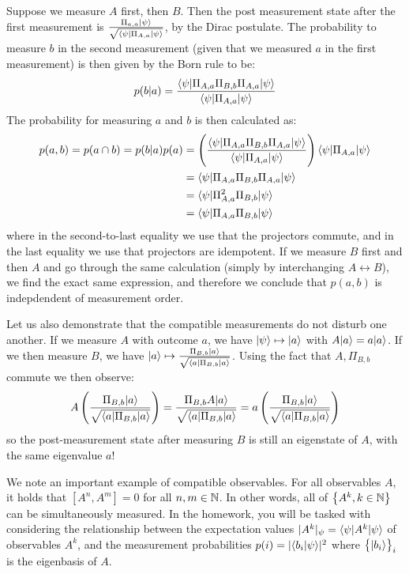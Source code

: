 Suppose we measure $A$ first, then $B$. Then the post measurement state after the first measurement is $\frac{\Pi_{a, a}\lvert \psi \rangle}{\sqrt{\langle \psi \rvert\Pi_{A, a}\lvert \psi \rangle}}$, by the Dirac postulate. The probability to measure $b$ in the second measurement (given that we measured $a$ in the first measurement) is then given by the Born rule to be:
\begin{equation}
    p(b\vert a) = \frac{\langle \psi \rvert\Pi_{A, a}\Pi_{B, b}\Pi_{A, a}\lvert \psi \rangle}{\langle \psi \rvert\Pi_{A, a}\lvert \psi \rangle}
\end{equation}
The probability for measuring $a$ and $b$ is then calculated as:
\begin{equation}
    \begin{split}
        p(a, b) = p(a \cap b) = p(b \vert a)p(a) &= \left(\frac{\langle \psi \rvert\Pi_{A, a}\Pi_{B, b}\Pi_{A, a}\lvert \psi \rangle}{\langle \psi \rvert\Pi_{A, a}\lvert \psi \rangle}\right)\langle \psi \rvert\Pi_{A, a}\lvert \psi \rangle
        \\ &= \langle \psi \rvert\Pi_{A, a}\Pi_{B, b}\Pi_{A, a}\lvert \psi \rangle
        \\ &= \langle \psi \rvert\Pi_{A, a}^2\Pi_{B, b}\lvert \psi \rangle
        \\ &= \langle \psi \rvert\Pi_{A, a}\Pi_{B, b}\lvert \psi \rangle
    \end{split}
\end{equation}
where in the second-to-last equality we use that the projectors commute, and in the last equality we use that projectors are idempotent. If we measure $B$ first and then $A$ and go through the same calculation (simply by interchanging $A \leftrightarrow B$), we find the exact same expression, and therefore we conclude that $p(a, b)$ is indepdendent of measurement order.

Let us also demonstrate that the compatible measurements do not disturb one another. If we measure $A$ with outcome $a$, we have $\lvert \psi \rangle \mapsto \lvert a \rangle$ with $A \lvert a \rangle = a\lvert a \rangle$. If we then measure $B$, we have $\lvert a \rangle \mapsto \frac{\Pi_{B, b}\lvert a \rangle}{\sqrt{\langle a \rvert\Pi_{B, b}\lvert a \rangle}}$. Using the fact that $A, \Pi_{B, b}$ commute we then observe:
\begin{equation}
    A\left( \frac{\Pi_{B, b}\lvert a \rangle}{\sqrt{\langle a \rvert\Pi_{B, b}\lvert a \rangle}}\right) = \frac{\Pi_{B, b}A\lvert a \rangle}{\sqrt{\langle a \rvert\Pi_{B, b}\lvert a \rangle}} = a\left( \frac{\Pi_{B, b}\lvert a \rangle}{\sqrt{\langle a \rvert\Pi_{B, b}\lvert a \rangle}}\right)
\end{equation}
so the post-measurement state after measuring $B$ is still an eigenstate of $A$, with the same eigenvalue $a$!

We note an important example of compatible observables. For all observables $A$, it holds that $[A^n, A^m] = 0$ for all $n, m \in \mathbb{N}$. In other words, all of $\set{A^k, k \in \mathbb{N}}$ can be simultaneously measured. In the homework, you will be tasked with considering the relationship between the expectation values $\lvert A^k \rvert_\psi = \langle \psi \rvert A^k\lvert \psi \rangle$ of observables $A^k$, and the measurement probabilities $p(i) = \lvert \langle b_i \lvert \psi \rangle \rvert^2$ where $\set{\lvert b_i \rangle}_i$ is the eigenbasis of $A$. 

